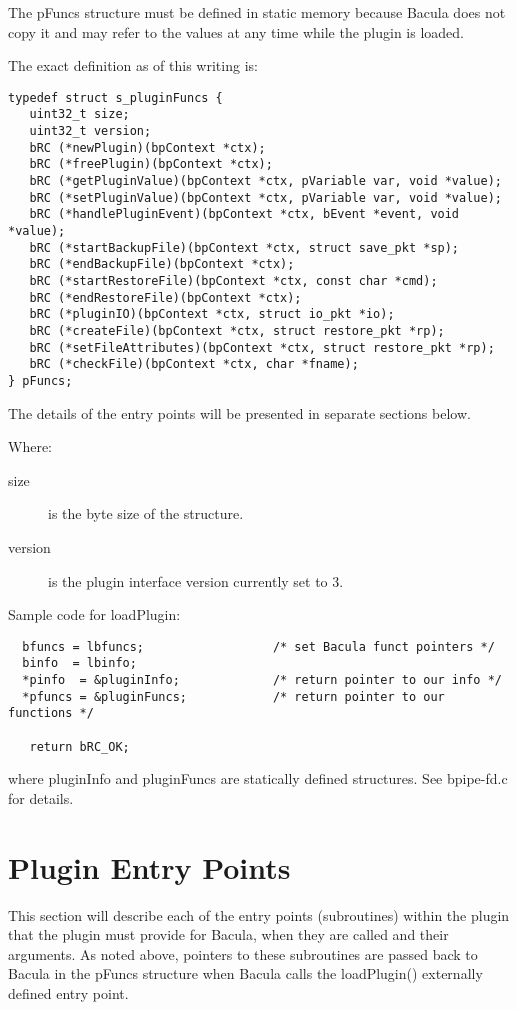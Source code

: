 \begin{description}
The pFuncs structure must be defined in static memory because Bacula does not
copy it and may refer to the values at any time while the plugin is
loaded.

The exact definition as of this writing is:

\begin{verbatim}
typedef struct s_pluginFuncs {
   uint32_t size;
   uint32_t version;
   bRC (*newPlugin)(bpContext *ctx);
   bRC (*freePlugin)(bpContext *ctx);
   bRC (*getPluginValue)(bpContext *ctx, pVariable var, void *value);
   bRC (*setPluginValue)(bpContext *ctx, pVariable var, void *value);
   bRC (*handlePluginEvent)(bpContext *ctx, bEvent *event, void *value);
   bRC (*startBackupFile)(bpContext *ctx, struct save_pkt *sp);
   bRC (*endBackupFile)(bpContext *ctx);
   bRC (*startRestoreFile)(bpContext *ctx, const char *cmd);
   bRC (*endRestoreFile)(bpContext *ctx);
   bRC (*pluginIO)(bpContext *ctx, struct io_pkt *io);
   bRC (*createFile)(bpContext *ctx, struct restore_pkt *rp);
   bRC (*setFileAttributes)(bpContext *ctx, struct restore_pkt *rp);
   bRC (*checkFile)(bpContext *ctx, char *fname);
} pFuncs;
\end{verbatim}

The details of the entry points will be presented in
separate sections below.

Where:
 \begin{description}
 \item [size] is the byte size of the structure.
 \item [version] is the plugin interface version currently set to 3.
 \end{description}

Sample code for loadPlugin:
\begin{verbatim}
  bfuncs = lbfuncs;                  /* set Bacula funct pointers */
  binfo  = lbinfo;
  *pinfo  = &pluginInfo;             /* return pointer to our info */
  *pfuncs = &pluginFuncs;            /* return pointer to our functions */

   return bRC_OK;
\end{verbatim}

where pluginInfo and pluginFuncs are statically defined structures.
See bpipe-fd.c for details.



\end{description}

\section{Plugin Entry Points}
This section will describe each of the entry points (subroutines) within
the plugin that the plugin must provide for Bacula, when they are called
and their arguments. As noted above, pointers to these subroutines are
passed back to Bacula in the pFuncs structure when Bacula calls the
loadPlugin() externally defined entry point.

